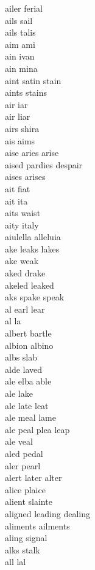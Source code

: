 ailer ferial \\
ails sail\\
ails talis \\
aim ami\\
ain ivan \\
ain mina \\
aint satin stain \\
aints stains \\
air iar\\
air liar \\
airs shira \\
ais aims \\
aise aries arise \\
aised pardies despair  \\
aises arises \\
ait fiat \\
ait ita\\
aits waist \\
aity italy \\
aiulella alleluia\\
ake leaks lakes  \\
ake weak \\
aked drake \\
akeled leaked\\
aks spake speak  \\
al earl lear  \\
al la\\
albert bartle\\
albion albino\\
albs slab\\
alde laved \\
ale elba able \\
ale lake \\
ale late leat \\
ale meal lame \\
ale peal plea leap \\
ale veal \\
aled pedal \\
aler pearl \\
alert later alter\\
alice plaice \\
alient slainte \\
aligned leading dealing\\
aliments ailments\\
aling signal \\
alks stalk \\
all lal\\
